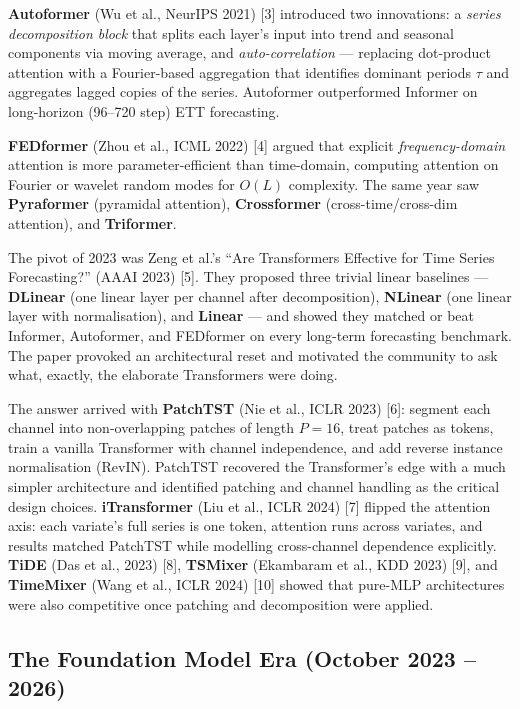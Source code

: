 \textbf{Autoformer} (Wu et al., NeurIPS 2021) {[}3{]} introduced two innovations: a \emph{series decomposition block} that splits each layer's input into trend and seasonal components via moving average, and \emph{auto-correlation} --- replacing dot-product attention with a Fourier-based aggregation that identifies dominant periods \(\tau\) and aggregates lagged copies of the series. Autoformer outperformed Informer on long-horizon (96--720 step) ETT forecasting.

\textbf{FEDformer} (Zhou et al., ICML 2022) {[}4{]} argued that explicit \emph{frequency-domain} attention is more parameter-efficient than time-domain, computing attention on Fourier or wavelet random modes for \(O(L)\) complexity. The same year saw \textbf{Pyraformer} (pyramidal attention), \textbf{Crossformer} (cross-time/cross-dim attention), and \textbf{Triformer}.

The pivot of 2023 was Zeng et al.'s ``Are Transformers Effective for Time Series Forecasting?'' (AAAI 2023) {[}5{]}. They proposed three trivial linear baselines --- \textbf{DLinear} (one linear layer per channel after decomposition), \textbf{NLinear} (one linear layer with normalisation), and \textbf{Linear} --- and showed they matched or beat Informer, Autoformer, and FEDformer on every long-term forecasting benchmark. The paper provoked an architectural reset and motivated the community to ask what, exactly, the elaborate Transformers were doing.

The answer arrived with \textbf{PatchTST} (Nie et al., ICLR 2023) {[}6{]}: segment each channel into non-overlapping patches of length \(P=16\), treat patches as tokens, train a vanilla Transformer with channel independence, and add reverse instance normalisation (RevIN). PatchTST recovered the Transformer's edge with a much simpler architecture and identified patching and channel handling as the critical design choices. \textbf{iTransformer} (Liu et al., ICLR 2024) {[}7{]} flipped the attention axis: each variate's full series is one token, attention runs across variates, and results matched PatchTST while modelling cross-channel dependence explicitly. \textbf{TiDE} (Das et al., 2023) {[}8{]}, \textbf{TSMixer} (Ekambaram et al., KDD 2023) {[}9{]}, and \textbf{TimeMixer} (Wang et al., ICLR 2024) {[}10{]} showed that pure-MLP architectures were also competitive once patching and decomposition were applied.

\subsection{The Foundation Model Era (October 2023 -- 2026)}\label{the-foundation-model-era-october-2023-2026}

